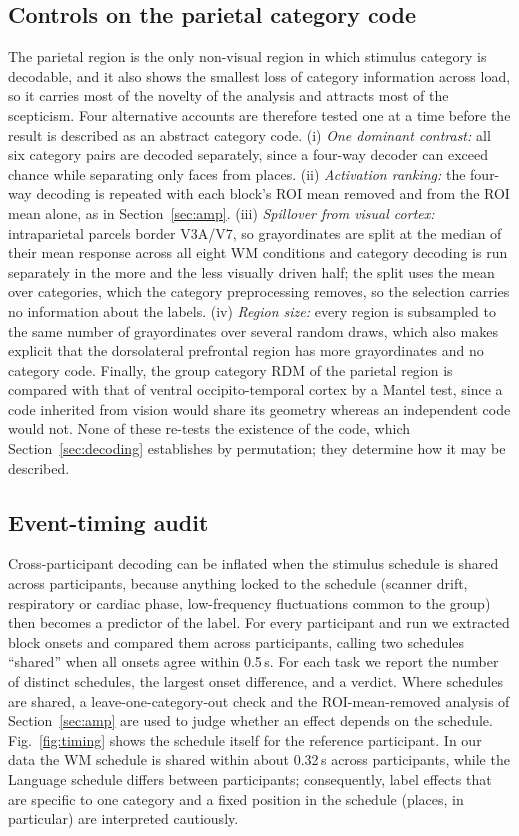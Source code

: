 \documentclass[conference]{IEEEtran}
\begin{document}
\subsection{Controls on the parietal category code}
\label{sec:parietal}
The parietal region is the only non-visual region in which stimulus category is decodable, and it also shows the smallest loss of category information across load, so it carries most of the novelty of the analysis and attracts most of the scepticism. Four alternative accounts are therefore tested one at a time before the result is described as an abstract category code. (i) \emph{One dominant contrast:} all six category pairs are decoded separately, since a four-way decoder can exceed chance while separating only faces from places. (ii) \emph{Activation ranking:} the four-way decoding is repeated with each block's ROI mean removed and from the ROI mean alone, as in Section~\ref{sec:amp}. (iii) \emph{Spillover from visual cortex:} intraparietal parcels border V3A/V7, so grayordinates are split at the median of their mean response across all eight WM conditions and category decoding is run separately in the more and the less visually driven half; the split uses the mean over categories, which the category preprocessing removes, so the selection carries no information about the labels. (iv) \emph{Region size:} every region is subsampled to the same number of grayordinates over several random draws, which also makes explicit that the dorsolateral prefrontal region has more grayordinates and no category code. Finally, the group category RDM of the parietal region is compared with that of ventral occipito-temporal cortex by a Mantel test, since a code inherited from vision would share its geometry whereas an independent code would not. None of these re-tests the existence of the code, which Section~\ref{sec:decoding} establishes by permutation; they determine how it may be described.

\subsection{Event-timing audit}
\label{sec:timing}
Cross-participant decoding can be inflated when the stimulus schedule is shared across participants, because anything locked to the schedule (scanner drift, respiratory or cardiac phase, low-frequency fluctuations common to the group) then becomes a predictor of the label. For every participant and run we extracted block onsets and compared them across participants, calling two schedules ``shared'' when all onsets agree within 0.5\,s. For each task we report the number of distinct schedules, the largest onset difference, and a verdict. Where schedules are shared, a leave-one-category-out check and the ROI-mean-removed analysis of Section~\ref{sec:amp} are used to judge whether an effect depends on the schedule. Fig.~\ref{fig:timing} shows the schedule itself for the reference participant. In our data the WM schedule is shared within about 0.32\,s across participants, while the Language schedule differs between participants; consequently, label effects that are specific to one category and a fixed position in the schedule (places, in particular) are interpreted cautiously.
\end{document}
